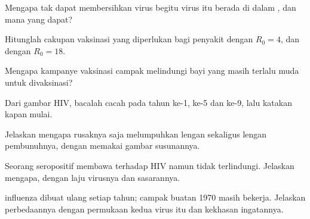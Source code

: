 \begin{exercise}[$\star\star$]\label{exo:g12:adaptive-immunity:8}
Mengapa  tak dapat membersihkan virus begitu virus itu berada
di dalam , dan  mana yang dapat?
\end{exercise}

\begin{exercise}[$\star\star$]\label{exo:g12:adaptive-immunity:9}
Hitunglah cakupan vaksinasi yang diperlukan bagi penyakit dengan $R_0 = 4$,
dan dengan $R_0 = 18$.
\end{exercise}

\begin{exercise}[$\star\star$]\label{exo:g12:adaptive-immunity:10}
Mengapa kampanye vaksinasi campak melindungi bayi yang masih terlalu
muda untuk divaksinasi?
\end{exercise}

\begin{exercise}[$\star\star$]\label{exo:g12:adaptive-immunity:11}
Dari gambar HIV, bacalah cacah  pada tahun ke-1, ke-5 dan
ke-9, lalu katakan kapan  mulai.
\end{exercise}

\begin{exercise}[$\star\star\star$]\label{exo:g12:adaptive-immunity:12}
Jelaskan mengapa rusaknya  saja melumpuhkan lengan
 sekaligus lengan  pembunuhnya, dengan memakai gambar
susunannya.
\end{exercise}

\begin{exercise}[$\star\star\star$]\label{exo:g12:adaptive-immunity:13}
Seorang seropositif membawa  terhadap HIV namun tidak
terlindungi. Jelaskan mengapa, dengan laju  virusnya dan
sasarannya.
\end{exercise}

\begin{exercise}[$\star\star\star$]\label{exo:g12:adaptive-immunity:14}
 influenza dibuat ulang setiap tahun;  campak buatan 1970
masih bekerja. Jelaskan perbedaannya dengan   permukaan
kedua virus itu dan kekhasan ingatannya.
\end{exercise}

